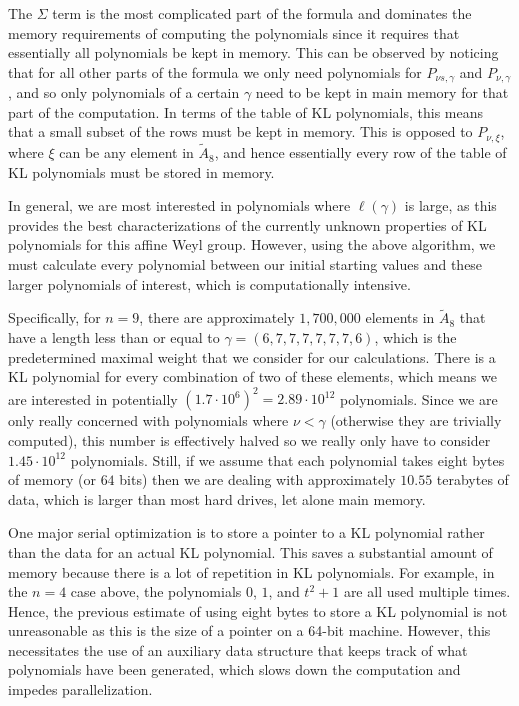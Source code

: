 \documentclass[12pt]{article} %
\begin{document}
The $\Sigma$ term is the most complicated part of the formula and dominates the memory requirements of computing the polynomials since it requires that essentially all polynomials  be kept in memory. This can be observed by noticing that for all other parts of the formula we only need polynomials for $P_{\nu s,\gamma}$ and $P_{\nu,\gamma}$, and so only polynomials of a certain $\gamma$ need to be kept in main memory for that part of the computation. In terms of the table of KL polynomials, this means that a small subset of the rows must be kept in memory. This is opposed to $P_{\nu ,\xi}$, where $\xi$ can be any element in $\tilde A_8$, and hence essentially every row of the table of KL polynomials must be stored in memory.

In general, we are most interested in polynomials where $\ell(\gamma)$ is large, as this provides the best characterizations of the currently unknown properties of KL polynomials for this affine Weyl group. However, using the above algorithm, we must calculate every polynomial between our initial starting values and these larger polynomials of interest, which is computationally intensive.

Specifically, for $n=9$, there are approximately $1,700,000$ elements  in $\tilde A_8$ that have a length less than or equal to $\gamma = (6,7,7,7,7,7,7,6)$, which is the predetermined maximal weight that we consider for our calculations. There is a KL polynomial for every combination of two of these elements, which means we are interested in potentially $(1.7\cdot 10^6)^2 = 2.89\cdot 10^{12}$ polynomials. Since we are only really concerned with polynomials where $\nu < \gamma$ (otherwise they are trivially computed), this number is effectively halved so  we really only have to consider $1.45\cdot 10^{12}$ polynomials. Still, if we assume that each polynomial takes eight bytes of memory (or $64$ bits) then we are dealing with approximately $10.55$ terabytes of data, which is larger than most hard drives, let alone main memory. 

One major serial optimization is to store a pointer to a KL polynomial rather than the data for an actual KL polynomial. This saves a substantial amount of memory because there is a lot of repetition in KL polynomials. For example, in the $n=4$ case above, the polynomials $0$, $1$, and $t^2+1$ are all used multiple times. Hence, the previous estimate of using eight bytes to store a KL polynomial is not unreasonable as this is the size of a pointer on a 64-bit machine. However, this necessitates the use  of an auxiliary data structure that keeps track of what polynomials have been generated, which slows down the computation and impedes parallelization. 
\end{document}
